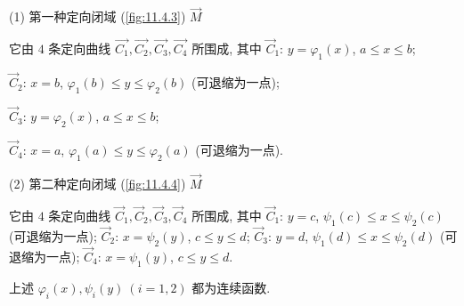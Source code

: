 (1) 第一种定向闭域 (\cref{fig:11.4.3}) $\overrightarrow{M}$

它由 $4$ 条定向曲线 $\overrightarrow{C_{1}},\overrightarrow{C_{2}},\overrightarrow{C_{3}},\overrightarrow{C_{4}}$ 所围成, 其中 $\overrightarrow{C}_{1}$: $y=\varphi_{1}(x)$, $a\leqslant x\leqslant b$;

$\overrightarrow{C}_{2}$: $x=b$, $\varphi_{1}(b)\leqslant y\leqslant\varphi_{2}(b)$ (可退缩为一点);

$\overrightarrow{C}_{3}$: $y=\varphi_{2}(x)$, $a\leqslant x\leqslant b$;

$\overrightarrow{C}_{4}$: $x=a$, $\varphi_{1}(a)\leqslant y\leqslant\varphi_{2}(a)$ (可退缩为一点).

(2) 第二种定向闭域 (\cref{fig:11.4.4}) $\overrightarrow{M}$

它由 $4$ 条定向曲线 $\overrightarrow{C}_{1},\overrightarrow{C}_{2},\overrightarrow{C}_{3},\overrightarrow{C}_{4}$ 所围成, 其中 $\overrightarrow{C}_{1}$: $y=c$, $\psi_{1}(c)\leqslant x\leqslant\psi_{2}(c)$ (可退缩为一点); $\overrightarrow{C}_{2}$: $x=\psi_{2}(y)$, $c\leqslant y\leqslant d$; $\overrightarrow{C}_{3}$: $y=d$, $\psi_{1}(d)\leqslant x\leqslant\psi_{2}(d)$ (可退缩为一点); $\overrightarrow{C}_{4}$: $x=\psi_{1}(y)$, $c\leqslant y\leqslant d$.

上述 $\varphi_{i}(x),\psi_{i}(y)\ (i=1,2)$ 都为连续函数.

